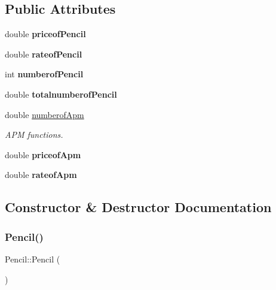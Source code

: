 \subsection*{Public Attributes}
\begin{DoxyCompactItemize}
\item 
\mbox{\label{classPencil_a71779a08ea791bf285d7e7d901d49d96}} 
double {\bfseries priceof\+Pencil}
\item 
\mbox{\label{classPencil_acc8e87622507eb7d7b6802c561bbf4b5}} 
double {\bfseries rateof\+Pencil}
\item 
\mbox{\label{classPencil_a42f809cbd4230815aed7212fe148367c}} 
int {\bfseries numberof\+Pencil}
\item 
\mbox{\label{classPencil_a80b094bc36884ba078bc6e07c56871af}} 
double {\bfseries totalnumberof\+Pencil}
\item 
\mbox{\label{classPencil_a07127489c562b29b05f439ea380db9d0}} 
double \hyperlink{classPencil_a07127489c562b29b05f439ea380db9d0}{numberof\+Apm}
\begin{DoxyCompactList}\small\item\em A\+PM functions. \end{DoxyCompactList}\item 
\mbox{\label{classPencil_a34a1a763466d2ea7408bf470adcf63f2}} 
double {\bfseries priceof\+Apm}
\item 
\mbox{\label{classPencil_a5b8822d01032897b432fff6ac20d6fb5}} 
double {\bfseries rateof\+Apm}
\end{DoxyCompactItemize}


\subsection{Constructor \& Destructor Documentation}
\mbox{\label{classPencil_a0dbfad3eebde26e9d5dacace449d9e14}} 
\subsubsection{\texorpdfstring{Pencil()}{Pencil()}}
{\footnotesize\ttfamily Pencil\+::\+Pencil (\begin{DoxyParamCaption}{ }\end{DoxyParamCaption})}

